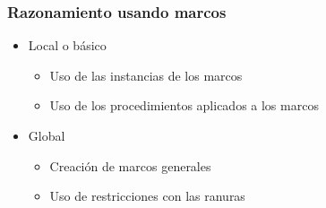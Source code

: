 \documentclass[
10pt, %
aspectratio=169, %
]{beamer}
\begin{document}
	\begin{frame}
		
		\frametitle{Razonamiento usando marcos}
		
		
		\begin{itemize}
			\item Local o básico
			\begin{itemize}
				\item Uso de las instancias de los marcos 
				\item Uso de los procedimientos aplicados a los marcos
			\end{itemize}
			
			\vspace{1\baselineskip}
			\item Global
			\begin{itemize}
				\item Creación de marcos generales 
				\item Uso de restricciones con las ranuras
			\end{itemize}
			
		\end{itemize}
		
	\end{frame}
	
\end{document}
